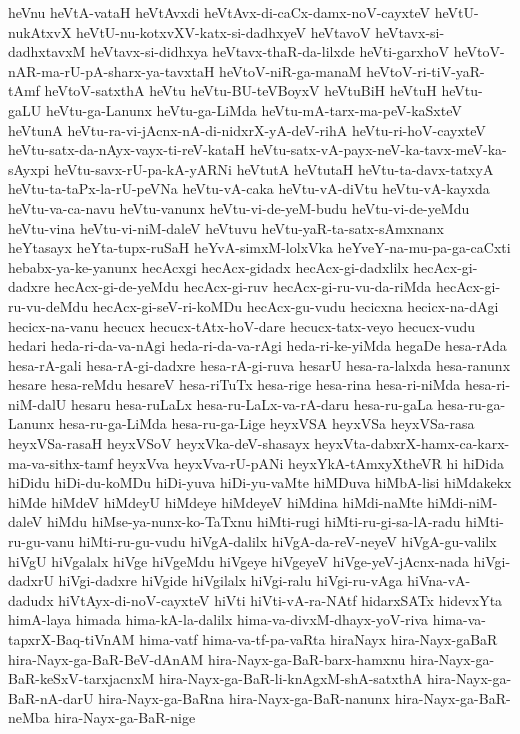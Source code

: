 {heVnu
heVtA-vataH
heVtAvxdi
heVtAvx-di-caCx-damx-noV-cayxteV
heVtU-nukAtxvX
heVtU-nu-kotxvXV-katx-si-dadhxyeV
heVtavoV
heVtavx-si-dadhxtavxM
heVtavx-si-didhxya
heVtavx-thaR-da-lilxde
heVti-garxhoV
heVtoV-nAR-ma-rU-pA-sharx-ya-tavxtaH
heVtoV-niR-ga-manaM
heVtoV-ri-tiV-yaR-tAmf
heVtoV-satxthA
heVtu
heVtu-BU-teVBoyxV
heVtuBiH
heVtuH
heVtu-gaLU
heVtu-ga-Lanunx
heVtu-ga-LiMda
heVtu-mA-tarx-ma-peV-kaSxteV
heVtunA
heVtu-ra-vi-jAcnx-nA-di-nidxrX-yA-deV-rihA
heVtu-ri-hoV-cayxteV
heVtu-satx-da-nAyx-vayx-ti-reV-kataH
heVtu-satx-vA-payx-neV-ka-tavx-meV-ka-sAyxpi
heVtu-savx-rU-pa-kA-yARNi
heVtutA
heVtutaH
heVtu-ta-davx-tatxyA
heVtu-ta-taPx-la-rU-peVNa
heVtu-vA-caka
heVtu-vA-diVtu
heVtu-vA-kayxda
heVtu-va-ca-navu
heVtu-vanunx
heVtu-vi-de-yeM-budu
heVtu-vi-de-yeMdu
heVtu-vina
heVtu-vi-niM-daleV
heVtuvu
heVtu-yaR-ta-satx-sAmxnanx
heYtasayx
heYta-tupx-ruSaH
heYvA-simxM-lolxVka
heYveY-na-mu-pa-ga-caCxti
hebabx-ya-ke-yanunx
hecAcxgi
hecAcx-gidadx
hecAcx-gi-dadxlilx
hecAcx-gi-dadxre
hecAcx-gi-de-yeMdu
hecAcx-gi-ruv
hecAcx-gi-ru-vu-da-riMda
hecAcx-gi-ru-vu-deMdu
hecAcx-gi-seV-ri-koMDu
hecAcx-gu-vudu
hecicxna
hecicx-na-dAgi
hecicx-na-vanu
hecucx
hecucx-tAtx-hoV-dare
hecucx-tatx-veyo
hecucx-vudu
hedari
heda-ri-da-va-nAgi
heda-ri-da-va-rAgi
heda-ri-ke-yiMda
hegaDe
hesa-rAda
hesa-rA-gali
hesa-rA-gi-dadxre
hesa-rA-gi-ruva
hesarU
hesa-ra-lalxda
hesa-ranunx
hesare
hesa-reMdu
hesareV
hesa-riTuTx
hesa-rige
hesa-rina
hesa-ri-niMda
hesa-ri-niM-dalU
hesaru
hesa-ruLaLx
hesa-ru-LaLx-va-rA-daru
hesa-ru-gaLa
hesa-ru-ga-Lanunx
hesa-ru-ga-LiMda
hesa-ru-ga-Lige
heyxVSA
heyxVSa
heyxVSa-rasa
heyxVSa-rasaH
heyxVSoV
heyxVka-deV-shasayx
heyxVta-dabxrX-hamx-ca-karx-ma-va-sithx-tamf
heyxVva
heyxVva-rU-pANi
heyxYkA-tAmxyXtheVR
hi
hiDida
hiDidu
hiDi-du-koMDu
hiDi-yuva
hiDi-yu-vaMte
hiMDuva
hiMbA-lisi
hiMdakekx
hiMde
hiMdeV
hiMdeyU
hiMdeye
hiMdeyeV
hiMdina
hiMdi-naMte
hiMdi-niM-daleV
hiMdu
hiMse-ya-nunx-ko-TaTxnu
hiMti-rugi
hiMti-ru-gi-sa-lA-radu
hiMti-ru-gu-vanu
hiMti-ru-gu-vudu
hiVgA-dalilx
hiVgA-da-reV-neyeV
hiVgA-gu-valilx
hiVgU
hiVgalalx
hiVge
hiVgeMdu
hiVgeye
hiVgeyeV
hiVge-yeV-jAcnx-nada
hiVgi-dadxrU
hiVgi-dadxre
hiVgide
hiVgilalx
hiVgi-ralu
hiVgi-ru-vAga
hiVna-vA-dadudx
hiVtAyx-di-noV-cayxteV
hiVti
hiVti-vA-ra-NAtf
hidarxSATx
hidevxYta
himA-laya
himada
hima-kA-la-dalilx
hima-va-divxM-dhayx-yoV-riva
hima-va-tapxrX-Baq-tiVnAM
hima-vatf
hima-va-tf-pa-vaRta
hiraNayx
hira-Nayx-gaBaR
hira-Nayx-ga-BaR-BeV-dAnAM
hira-Nayx-ga-BaR-barx-hamxnu
hira-Nayx-ga-BaR-keSxV-tarxjacnxM
hira-Nayx-ga-BaR-li-knAgxM-shA-satxthA
hira-Nayx-ga-BaR-nA-darU
hira-Nayx-ga-BaRna
hira-Nayx-ga-BaR-nanunx
hira-Nayx-ga-BaR-neMba
hira-Nayx-ga-BaR-nige
}
